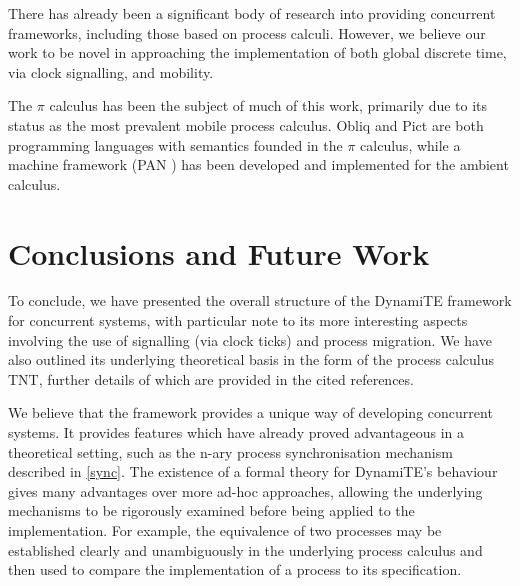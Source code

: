 \documentclass{acm_proc_article-sp}
\begin{document}
There has already been a significant body of research into providing
concurrent frameworks, including those based on process calculi.
However, we believe our work to be novel in approaching the
implementation of both global discrete time, via clock signalling, and
mobility.

The $\pi$ calculus has been the subject of much of this work, primarily
due to its status as the most prevalent mobile process calculus.  Obliq
\cite{obliq} and Pict \cite{daveturner:phd} are both programming
languages with semantics founded in the $\pi$ calculus, while a machine
framework (PAN \cite{sangiorgi:safeambientsmachine}) has been developed
and implemented for the ambient calculus.

\section{Conclusions and Future Work}

To conclude, we have presented the overall structure of the DynamiTE
framework for concurrent systems, with particular note to its more
interesting aspects involving the use of signalling (via clock ticks)
and process migration.  We have also outlined its underlying theoretical
basis in the form of the process calculus TNT, further details of which
are provided in the cited references.

We believe that the framework provides a unique way of developing
concurrent systems.  It provides features which have already proved
advantageous in a theoretical setting, such as the n-ary process
synchronisation mechanism described in \ref{sync}.  The existence of a
formal theory for DynamiTE's behaviour gives many advantages over more
ad-hoc approaches, allowing the underlying mechanisms to be rigorously
examined before being applied to the implementation.  For example, the
equivalence of two processes may be established clearly and
unambiguously in the underlying process calculus and then used to
compare the implementation of a process to its specification.
\end{document}
